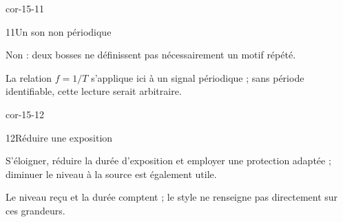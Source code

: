 \begin{blocLivre}{cor-15-11}\begin{corrige}{11}{Un son non périodique}
\begin{questions}
\item Non : deux bosses ne définissent pas nécessairement un motif répété.
\item La relation $f=1/T$ s’applique ici à un signal périodique ; sans période identifiable, cette lecture serait arbitraire.
\end{questions}
\end{corrige}\end{blocLivre}
\begin{blocLivre}{cor-15-12}\begin{corrige}{12}{Réduire une exposition}
\begin{questions}
\item S’éloigner, réduire la durée d’exposition et employer une protection adaptée ; diminuer le niveau à la source est également utile.
\item Le niveau reçu et la durée comptent ; le style ne renseigne pas directement sur ces grandeurs.
\end{questions}
\end{corrige}\end{blocLivre}

